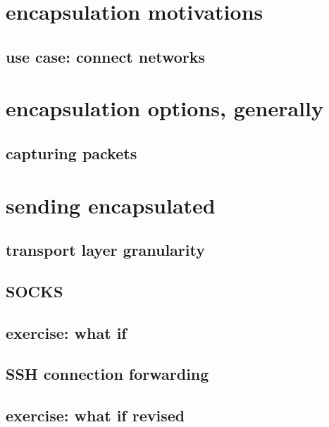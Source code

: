 
\section{encapsulation motivations}

\subsection{use case: connect networks}



\section{encapsulation options, generally}


\subsection{capturing packets}


\section{sending encapsulated}

\subsection{transport layer granularity}


\subsection{SOCKS}


\subsection{exercise: what if}


\subsection{SSH connection forwarding}


\subsection{exercise: what if revised}



